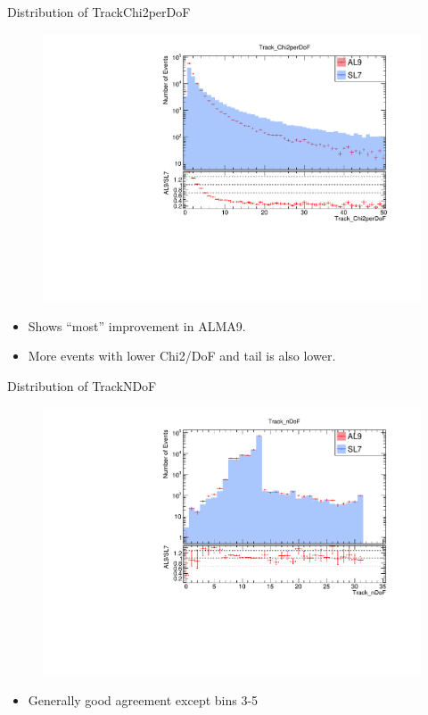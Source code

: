 \begin{frame}{Distribution of TrackChi2perDoF}
    \begin{figure}
        \includegraphics[width=0.9\linewidth]{./output/Track_Chi2perDoF.pdf}
    \end{figure}
    \vspace{-0.5cm}
    \begin{itemize}
        \item Shows ``most'' improvement in ALMA9.
        \item More events with lower Chi2/DoF and tail is also lower.
    \end{itemize}
\end{frame}

\begin{frame}{Distribution of TrackNDoF}
    \begin{figure}
        \includegraphics[width=\linewidth]{./output/Track_nDoF.pdf}
    \end{figure}
    \vspace{-0.65cm}
    \begin{itemize}
        \item Generally good agreement except bins 3-5
    \end{itemize}
\end{frame}

